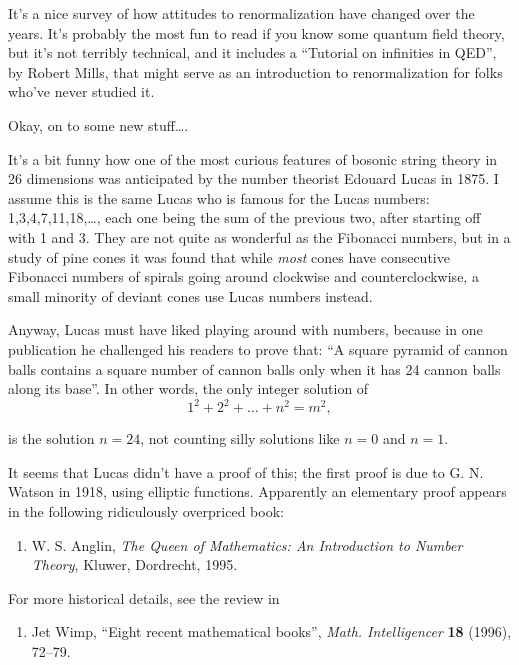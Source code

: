 \documentclass{article}
\def\tightlist{}
\begin{document}
It's a nice survey of how attitudes to renormalization have changed over
the years. It's probably the most fun to read if you know some quantum
field theory, but it's not terribly technical, and it includes a
``Tutorial on infinities in QED'', by Robert Mills, that might serve as
an introduction to renormalization for folks who've never studied it.

Okay, on to some new stuff\ldots.

It's a bit funny how one of the most curious features of bosonic string
theory in 26 dimensions was anticipated by the number theorist Edouard
Lucas in 1875. I assume this is the same Lucas who is famous for the
Lucas numbers: 1,3,4,7,11,18,\ldots, each one being the sum of the
previous two, after starting off with 1 and 3. They are not quite as
wonderful as the Fibonacci numbers, but in a study of pine cones it was
found that while \emph{most} cones have consecutive Fibonacci numbers of
spirals going around clockwise and counterclockwise, a small minority of
deviant cones use Lucas numbers instead.

Anyway, Lucas must have liked playing around with numbers, because in
one publication he challenged his readers to prove that: ``A square
pyramid of cannon balls contains a square number of cannon balls only
when it has 24 cannon balls along its base''. In other words, the only
integer solution of \[1^2 + 2^2 + \ldots + n^2 = m^2,\]

is the solution \(n = 24\), not counting silly solutions like \(n=0\)
and \(n=1\).

It seems that Lucas didn't have a proof of this; the first proof is due
to G. N. Watson in 1918, using elliptic functions. Apparently an
elementary proof appears in the following ridiculously overpriced book:

\begin{enumerate}
\def\labelenumi{\arabic{enumi})}
\setcounter{enumi}{1}
\tightlist
\item
  W. S. Anglin, \emph{The Queen of Mathematics: An Introduction to
  Number Theory}, Kluwer, Dordrecht, 1995.
\end{enumerate}

For more historical details, see the review in

\begin{enumerate}
\def\labelenumi{\arabic{enumi})}
\setcounter{enumi}{2}
\tightlist
\item
  Jet Wimp, ``Eight recent mathematical books'', \emph{Math.
  Intelligencer} \textbf{18} (1996), 72--79.
\end{enumerate}
\end{document}
